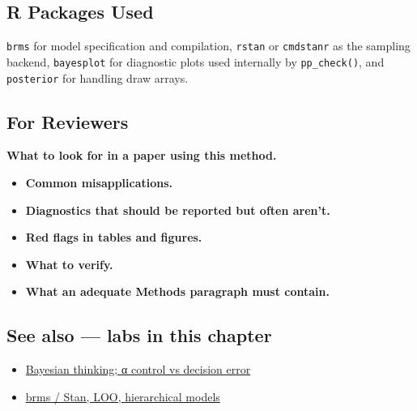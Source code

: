 \documentclass[
]{article}
\providecommand{\tightlist}{%
  \setlength{\itemsep}{0pt}\setlength{\parskip}{0pt}}
\begin{document}
\subsection{R Packages Used}\label{r-packages-used}

\texttt{brms} for model specification and compilation, \texttt{rstan} or
\texttt{cmdstanr} as the sampling backend, \texttt{bayesplot} for
diagnostic plots used internally by \texttt{pp\_check()}, and
\texttt{posterior} for handling draw arrays.

\subsection{For Reviewers}\label{for-reviewers}

\textbf{What to look for in a paper using this method.}

\begin{itemize}
\tightlist
\item
  \textbf{Common misapplications.}
\item
  \textbf{Diagnostics that should be reported but often aren't.}
\item
  \textbf{Red flags in tables and figures.}
\item
  \textbf{What to verify.}
\item
  \textbf{What an adequate Methods paragraph must contain.}
\end{itemize}

\subsection{See also --- labs in this
chapter}\label{see-also-labs-in-this-chapter}

\begin{itemize}
\tightlist
\item
  \href{labs/lab-bayesian-thinking-control-vs-decision-error.Rmd}{Bayesian
  thinking; α control vs decision error}
\item
  \href{labs/lab-brms-stan-loo-hierarchical-models.Rmd}{brms / Stan,
  LOO, hierarchical models}
\end{itemize}
\end{document}

